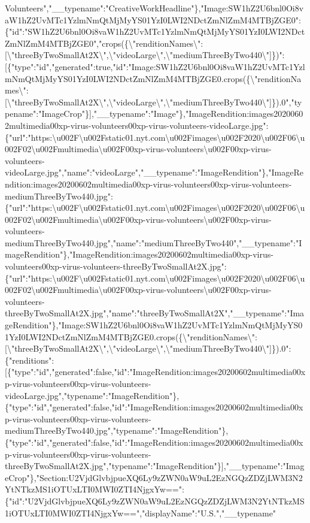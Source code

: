 Volunteers","\_\_typename":"CreativeWorkHeadline"\},"Image:SW1hZ2U6bnl0Oi8vaW1hZ2UvMTc1YzlmNmQtMjMyYS01YzI0LWI2NDctZmNlZmM4MTBjZGE0":\{"id":"SW1hZ2U6bnl0Oi8vaW1hZ2UvMTc1YzlmNmQtMjMyYS01YzI0LWI2NDctZmNlZmM4MTBjZGE0","crops(\{\textbackslash{}"renditionNames\textbackslash{}":{[}\textbackslash{}"threeByTwoSmallAt2X\textbackslash{}",\textbackslash{}"videoLarge\textbackslash{}",\textbackslash{}"mediumThreeByTwo440\textbackslash{}"{]}\})":{[}\{"type":"id","generated":true,"id":"Image:SW1hZ2U6bnl0Oi8vaW1hZ2UvMTc1YzlmNmQtMjMyYS01YzI0LWI2NDctZmNlZmM4MTBjZGE0.crops(\{\textbackslash{}"renditionNames\textbackslash{}":{[}\textbackslash{}"threeByTwoSmallAt2X\textbackslash{}",\textbackslash{}"videoLarge\textbackslash{}",\textbackslash{}"mediumThreeByTwo440\textbackslash{}"{]}\}).0","typename":"ImageCrop"\}{]},"\_\_typename":"Image"\},"ImageRendition:images20200602multimedia00xp-virus-volunteers00xp-virus-volunteers-videoLarge.jpg":\{"url":"https:\textbackslash{}u002F\textbackslash{}u002Fstatic01.nyt.com\textbackslash{}u002Fimages\textbackslash{}u002F2020\textbackslash{}u002F06\textbackslash{}u002F02\textbackslash{}u002Fmultimedia\textbackslash{}u002F00xp-virus-volunteers\textbackslash{}u002F00xp-virus-volunteers-videoLarge.jpg","name":"videoLarge","\_\_typename":"ImageRendition"\},"ImageRendition:images20200602multimedia00xp-virus-volunteers00xp-virus-volunteers-mediumThreeByTwo440.jpg":\{"url":"https:\textbackslash{}u002F\textbackslash{}u002Fstatic01.nyt.com\textbackslash{}u002Fimages\textbackslash{}u002F2020\textbackslash{}u002F06\textbackslash{}u002F02\textbackslash{}u002Fmultimedia\textbackslash{}u002F00xp-virus-volunteers\textbackslash{}u002F00xp-virus-volunteers-mediumThreeByTwo440.jpg","name":"mediumThreeByTwo440","\_\_typename":"ImageRendition"\},"ImageRendition:images20200602multimedia00xp-virus-volunteers00xp-virus-volunteers-threeByTwoSmallAt2X.jpg":\{"url":"https:\textbackslash{}u002F\textbackslash{}u002Fstatic01.nyt.com\textbackslash{}u002Fimages\textbackslash{}u002F2020\textbackslash{}u002F06\textbackslash{}u002F02\textbackslash{}u002Fmultimedia\textbackslash{}u002F00xp-virus-volunteers\textbackslash{}u002F00xp-virus-volunteers-threeByTwoSmallAt2X.jpg","name":"threeByTwoSmallAt2X","\_\_typename":"ImageRendition"\},"Image:SW1hZ2U6bnl0Oi8vaW1hZ2UvMTc1YzlmNmQtMjMyYS01YzI0LWI2NDctZmNlZmM4MTBjZGE0.crops(\{\textbackslash{}"renditionNames\textbackslash{}":{[}\textbackslash{}"threeByTwoSmallAt2X\textbackslash{}",\textbackslash{}"videoLarge\textbackslash{}",\textbackslash{}"mediumThreeByTwo440\textbackslash{}"{]}\}).0":\{"renditions":{[}\{"type":"id","generated":false,"id":"ImageRendition:images20200602multimedia00xp-virus-volunteers00xp-virus-volunteers-videoLarge.jpg","typename":"ImageRendition"\},\{"type":"id","generated":false,"id":"ImageRendition:images20200602multimedia00xp-virus-volunteers00xp-virus-volunteers-mediumThreeByTwo440.jpg","typename":"ImageRendition"\},\{"type":"id","generated":false,"id":"ImageRendition:images20200602multimedia00xp-virus-volunteers00xp-virus-volunteers-threeByTwoSmallAt2X.jpg","typename":"ImageRendition"\}{]},"\_\_typename":"ImageCrop"\},"Section:U2VjdGlvbjpueXQ6Ly9zZWN0aW9uL2EzNGQzZDZjLWM3N2YtNTkzMS1iOTUxLTI0MWI0ZTI4NjgxYw==":\{"id":"U2VjdGlvbjpueXQ6Ly9zZWN0aW9uL2EzNGQzZDZjLWM3N2YtNTkzMS1iOTUxLTI0MWI0ZTI4NjgxYw==","displayName":"U.S.","\_\_typename"